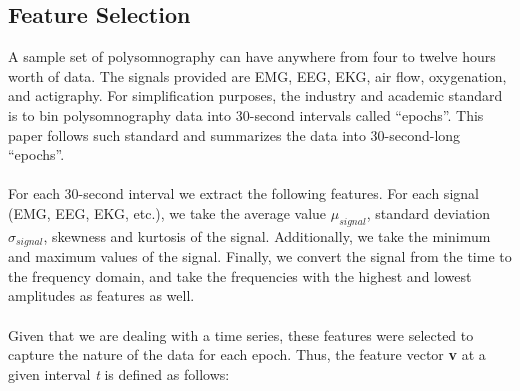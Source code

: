 \documentclass[10pt,a4paper]{report}
\begin{document}
\subsection*{Feature Selection}
A sample set of polysomnography can have anywhere from four to twelve hours worth of data. The signals provided are EMG, EEG, EKG, air flow, oxygenation, and actigraphy. For simplification purposes, the industry and academic standard is to bin polysomnography data into 30-second intervals called “epochs”. This paper follows such standard and summarizes the data into 30-second-long “epochs”. 
\\\\
For each 30-second interval we extract the following features. For each signal (EMG, EEG, EKG, etc.), we take the average value $\mu_{signal}$, standard deviation $\sigma_{signal}$, skewness and kurtosis of the signal. Additionally, we take the minimum and maximum values of the signal. Finally, we convert the signal from the time to the frequency domain, and take the frequencies with the highest and lowest amplitudes as features as well.
\\\\
Given that we are dealing with a time series, these features were selected to capture the nature of the data for each epoch. Thus, the feature vector \textbf{v} at a given interval \textit{t} is defined as follows:
\end{document}

